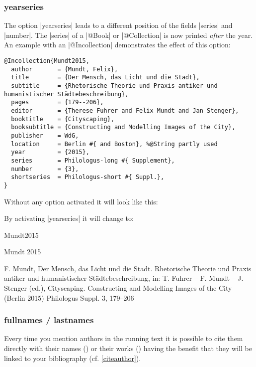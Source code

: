 \documentclass[a4paper,
10pt,
greek,
french,
spanish,
italian,
ngerman,
english
]{ltxdoc}
\begin{document}

\subsubsection{yearseries}\label{yearseries}
The option |yearseries| leads to a different position of the fields |series| and |number|.
The |series| of a |@Book| or |@Collection| is now printed \emph{after} the year.
An example with an |@Incollection| demonstrates the effect of this option:
 
\begin{lstlisting}[style=bibentry,label=Mundt2015,caption={{@}Incollection\{Mundt2015,…\}}]
@Incollection{Mundt2015,
  author       = {Mundt, Felix},
  title        = {Der Mensch, das Licht und die Stadt},
  subtitle     = {Rhetorische Theorie und Praxis antiker und humanistischer Städtebeschreibung},
  pages        = {179--206},
  editor       = {Therese Fuhrer and Felix Mundt and Jan Stenger},
  booktitle    = {Cityscaping},
  booksubtitle = {Constructing and Modelling Images of the City},
  publisher    = WdG,
  location     = Berlin #{ and Boston}, %@String partly used
  year         = {2015},
  series       = Philologus-long #{ Supplement},
  number       = {3},
  shortseries  = Philologus-short #{ Suppl.},
}
\end{lstlisting}

Without any option activated it will look like this:
 
By activating |yearseries| it will change to:
\begin{bibbsp}{Mundt2015}
\parbox[t]{1.7cm}{Mundt 2015} \parbox[t]{9cm}{F. Mundt, Der Mensch, das Licht und die Stadt. Rhetorische Theorie und Praxis antiker und humanistischer Städtebeschreibung, in: T. Fuhrer -- F. Mundt -- J. Stenger (ed.), Cityscaping. Constructing and Modelling Images of the City (Berlin 2015) {\color{red}Philologus Suppl. 3,} 179–206}
\end{bibbsp}

\subsubsection{fullnames / lastnames}\label{fullnames}\label{lastnames}
Every time you mention authors in the running text it is possible to cite them directly with their names () or their works  () having the benefit that they will be linked to your bibliography (cf. \cref{citeauthor}).
\end{document}
